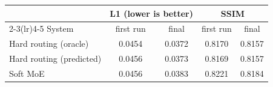 \begin{tabular}{lcccc}
\toprule
 & \multicolumn{2}{c}{L1 (lower is better)} & \multicolumn{2}{c}{SSIM} \\
\cmidrule(lr){2-3}\cmidrule(lr){4-5}
System & first run & final & first run & final \\
\midrule
Hard routing (oracle) & 0.0454 & 0.0372 & 0.8170 & 0.8157 \\
Hard routing (predicted) & 0.0456 & 0.0373 & 0.8169 & 0.8157 \\
Soft MoE & 0.0456 & 0.0383 & 0.8221 & 0.8184 \\
\bottomrule
\end{tabular}
